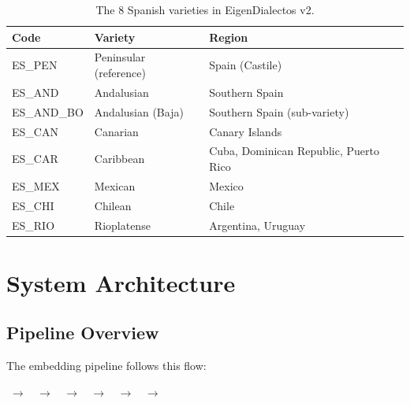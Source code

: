 \documentclass[11pt,a4paper]{article}
\begin{document}
\begin{table}[H]
\centering
\begin{tabular}{@{}lll@{}}
\toprule
\textbf{Code} & \textbf{Variety} & \textbf{Region} \\
\midrule
ES\_PEN & Peninsular (reference) & Spain (Castile) \\
ES\_AND & Andalusian & Southern Spain \\
ES\_AND\_BO & Andalusian (Baja) & Southern Spain (sub-variety) \\
ES\_CAN & Canarian & Canary Islands \\
ES\_CAR & Caribbean & Cuba, Dominican Republic, Puerto Rico \\
ES\_MEX & Mexican & Mexico \\
ES\_CHI & Chilean & Chile \\
ES\_RIO & Rioplatense & Argentina, Uruguay \\
\bottomrule
\end{tabular}
\caption{The 8 Spanish varieties in EigenDialectos v2.}
\label{tab:varieties}
\end{table}

\section{System Architecture}

\subsection{Pipeline Overview}

The embedding pipeline follows this flow:

\begin{center}
 $\;\to\;$
 $\;\to\;$
 $\;\to\;$
 $\;\to\;$
 $\;\to\;$
 $\;\to\;$
\end{center}
\end{document}
